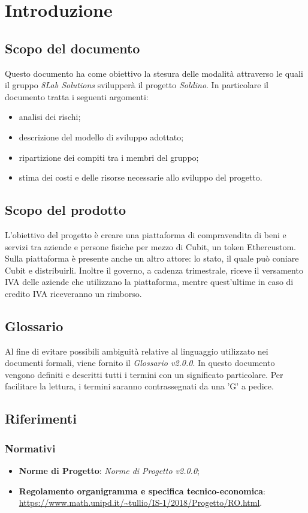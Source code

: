 \section{Introduzione}
\subsection{Scopo del documento}
Questo documento ha come obiettivo la stesura delle modalità attraverso le quali il gruppo \textit{8Lab Solutions} svilupperà il progetto \textit{Soldino}. In particolare il documento tratta i seguenti argomenti:
\begin{itemize}
	\item analisi dei rischi;
	\item descrizione del modello di sviluppo adottato;
	\item ripartizione dei compiti tra i membri del gruppo;
	\item stima dei costi e delle risorse necessarie allo sviluppo del progetto.
\end{itemize}
\subsection{Scopo del prodotto}
L'obiettivo del progetto è creare una piattaforma di compravendita di beni e servizi tra aziende e persone fisiche per mezzo di  Cubit\glo, un token Ether\glosp custom. Sulla piattaforma è presente anche un altro attore: lo stato, il quale può coniare Cubit
 e distribuirli. Inoltre il governo, a cadenza trimestrale, riceve il versamento IVA delle aziende che utilizzano la piattaforma, mentre quest'ultime in caso di credito IVA riceveranno un rimborso.
\subsection{Glossario}
Al fine di evitare possibili ambiguità relative al linguaggio utilizzato nei documenti formali, viene fornito il \textit{Glossario v2.0.0}. In questo documento vengono definiti e descritti tutti i termini con un significato particolare. Per facilitare la lettura, i termini saranno contrassegnati da una 'G' a pedice.
\subsection{Riferimenti}
\subsubsection{Normativi}
\begin{itemize}
	\item \textbf{Norme di Progetto}: \textit{Norme di Progetto v2.0.0};
	\item \textbf{Regolamento organigramma e specifica tecnico-economica}: \\
	\url{https://www.math.unipd.it/~tullio/IS-1/2018/Progetto/RO.html}.
\end{itemize}

